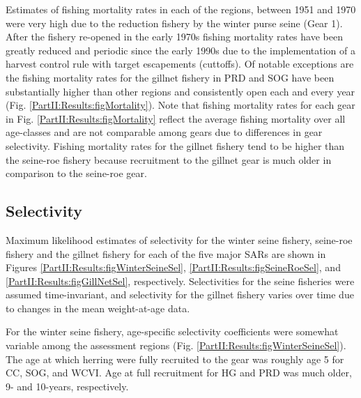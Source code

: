 Estimates of fishing mortality rates in each of the regions, between 1951 and 1970 were very high due to the reduction fishery by the winter purse seine (Gear 1).  After the fishery re-opened in the early 1970s fishing mortality rates have been greatly reduced and periodic since the early 1990s due to the implementation of a harvest control rule with target escapements (cuttoffs).  Of notable exceptions are the fishing mortality rates for the gillnet fishery in PRD  and SOG have been substantially higher than other regions and consistently open each and every year (Fig. \ref{PartII:Results:figMortality}). Note that fishing mortality rates for each gear in Fig. \ref{PartII:Results:figMortality} reflect the average fishing mortality over all age-classes and are not comparable among gears due to differences in gear selectivity. Fishing mortality rates for the gillnet fishery tend to be higher than the seine-roe fishery because recruitment to the gillnet gear is much older in comparison to the seine-roe gear.





\subsection{Selectivity}

Maximum likelihood estimates of selectivity for the winter seine fishery, seine-roe fishery and the gillnet fishery for each of the five major SARs are shown in Figures \ref{PartII:Results:figWinterSeineSel}, \ref{PartII:Results:figSeineRoeSel}, and \ref{PartII:Results:figGillNetSel}, respectively.  Selectivities for the seine fisheries were assumed time-invariant, and selectivity for the gillnet fishery varies over time due to changes in the mean weight-at-age data.

For the winter seine fishery, age-specific selectivity coefficients were somewhat variable among the assessment regions (Fig. \ref{PartII:Results:figWinterSeineSel}).  The age at which herring were fully recruited to the gear was roughly age 5 for CC, SOG, and WCVI.  Age at full recruitment for HG and PRD was much older, 9- and 10-years, respectively.



